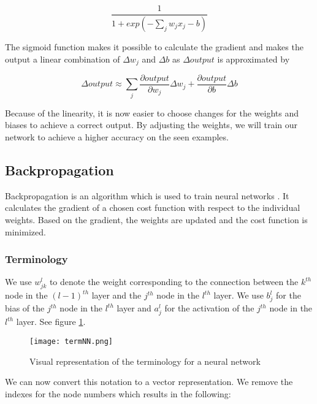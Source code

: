 \begin{equation} 
\frac{1}{1+exp(-\sum_j w_jx_j-b)}
\end{equation}

\noindent The sigmoid function makes it possible to calculate the gradient and makes the output a linear combination of $\Delta w_j$ and $\Delta b$ as $\Delta output$ is approximated by 

\begin{equation} 
\Delta output \approx \sum_j \frac{\partial output}{\partial w_j}\Delta w_j + \frac{\partial output}{\partial b}\Delta b
\end{equation}

\noindent Because of the linearity, it is now easier to choose changes for the weights and biases to achieve a correct output. By adjusting the weights, we will train our network to achieve a higher accuracy on the seen examples.
		
	\subsection{Backpropagation}
	
Backpropagation is an algorithm which is used to train neural networks \cite{bp:article}. It calculates the gradient of a chosen cost function with respect to the individual weights. Based on the gradient, the weights are updated and the cost function is minimized.

		\subsubsection{Terminology}
		
We use $w^l_{jk}$ to denote the weight corresponding to the connection between the $k^{th}$ node in the $(l-1)^{th}$ layer and the $j^{th}$ node in the $l^{th}$ layer. We use $b^l_j$ for the bias of the $j^{th}$ node in the $l^{th}$ layer and $a^l_j$ for the activation of the $j^{th}$ node in the $l^{th}$ layer. See figure \ref{fig:termNN}. \\

\begin{figure}[!htb]
	\centering
	\texttt{[image: termNN.png]}
	\caption{Visual representation of the terminology for a neural network \cite{NNintro:online}}
	\label{fig:termNN}
\end{figure} 

\noindent We can now convert this notation to a vector representation. We remove the indexes for the node numbers which results in the following:

